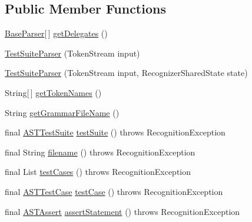 \subsection*{Public Member Functions}
\begin{DoxyCompactItemize}
\item 
\hyperlink{classorg_1_1tzi_1_1use_1_1parser_1_1base_1_1_base_parser}{Base\-Parser}\mbox{[}$\,$\mbox{]} \hyperlink{classorg_1_1tzi_1_1use_1_1parser_1_1testsuite_1_1_test_suite_parser_a34f6451de8c2a05b69836c052fb742b6}{get\-Delegates} ()
\item 
\hyperlink{classorg_1_1tzi_1_1use_1_1parser_1_1testsuite_1_1_test_suite_parser_afd79e4f1d0d74da1597082ddf1d2715c}{Test\-Suite\-Parser} (Token\-Stream input)
\item 
\hyperlink{classorg_1_1tzi_1_1use_1_1parser_1_1testsuite_1_1_test_suite_parser_a8108c98a026be70f5d153420e4ba6fd6}{Test\-Suite\-Parser} (Token\-Stream input, Recognizer\-Shared\-State state)
\item 
String\mbox{[}$\,$\mbox{]} \hyperlink{classorg_1_1tzi_1_1use_1_1parser_1_1testsuite_1_1_test_suite_parser_ae11502e80ed0fe446b550f5894419b0c}{get\-Token\-Names} ()
\item 
String \hyperlink{classorg_1_1tzi_1_1use_1_1parser_1_1testsuite_1_1_test_suite_parser_ab8576f587c540d0a8d39343d355acfe3}{get\-Grammar\-File\-Name} ()
\item 
final \hyperlink{classorg_1_1tzi_1_1use_1_1parser_1_1testsuite_1_1_a_s_t_test_suite}{A\-S\-T\-Test\-Suite} \hyperlink{classorg_1_1tzi_1_1use_1_1parser_1_1testsuite_1_1_test_suite_parser_a0c91cda64c2acfdea56c377ffecb2ed4}{test\-Suite} ()  throws Recognition\-Exception 
\item 
final String \hyperlink{classorg_1_1tzi_1_1use_1_1parser_1_1testsuite_1_1_test_suite_parser_af1c94f2929d9ee1909bd1f5dcffa8d56}{filename} ()  throws Recognition\-Exception 
\item 
final List \hyperlink{classorg_1_1tzi_1_1use_1_1parser_1_1testsuite_1_1_test_suite_parser_a1d8c8547de29d021e42abd679fe6fc18}{test\-Cases} ()  throws Recognition\-Exception 
\item 
final \hyperlink{classorg_1_1tzi_1_1use_1_1parser_1_1testsuite_1_1_a_s_t_test_case}{A\-S\-T\-Test\-Case} \hyperlink{classorg_1_1tzi_1_1use_1_1parser_1_1testsuite_1_1_test_suite_parser_ac4bafc34eb3c556b3809a4e585e618b3}{test\-Case} ()  throws Recognition\-Exception 
\item 
final \hyperlink{classorg_1_1tzi_1_1use_1_1parser_1_1testsuite_1_1_a_s_t_assert}{A\-S\-T\-Assert} \hyperlink{classorg_1_1tzi_1_1use_1_1parser_1_1testsuite_1_1_test_suite_parser_ab4d07c26ecd196cea368c2ba451d61da}{assert\-Statement} ()  throws Recognition\-Exception 

\end{DoxyCompactItemize}
